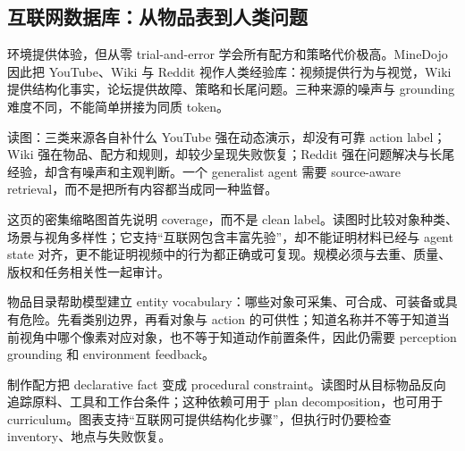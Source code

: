 \subsection{互联网数据库：从物品表到人类问题}

环境提供体验，但从零 trial-and-error 学会所有配方和策略代价极高。MineDojo 因此把 YouTube、Wiki 与 Reddit 视作人类经验库：视频提供行为与视觉，Wiki 提供结构化事实，论坛提供故障、策略和长尾问题。三种来源的噪声与 grounding 难度不同，不能简单拼接为同质 token。


\begin{knowledgebox}{读图：三类来源各自补什么}
YouTube 强在动态演示，却没有可靠 action label；Wiki 强在物品、配方和规则，却较少呈现失败恢复；Reddit 强在问题解决与长尾经验，却含有噪声和主观判断。一个 generalist agent 需要 source-aware retrieval，而不是把所有内容都当成同一种监督。
\end{knowledgebox}


这页的密集缩略图首先说明 coverage，而不是 clean label。读图时比较对象种类、场景与视角多样性；它支持“互联网包含丰富先验”，却不能证明材料已经与 agent state 对齐，更不能证明视频中的行为都正确或可复现。规模必须与去重、质量、版权和任务相关性一起审计。


物品目录帮助模型建立 entity vocabulary：哪些对象可采集、可合成、可装备或具有危险。先看类别边界，再看对象与 action 的可供性；知道名称并不等于知道当前视角中哪个像素对应对象，也不等于知道动作前置条件，因此仍需要 perception grounding 和 environment feedback。


制作配方把 declarative fact 变成 procedural constraint。读图时从目标物品反向追踪原料、工具和工作台条件；这种依赖可用于 plan decomposition，也可用于 curriculum。图表支持“互联网可提供结构化步骤”，但执行时仍要检查 inventory、地点与失败恢复。


